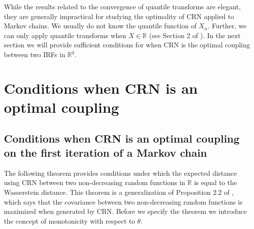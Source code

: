 \documentclass[12pt]{article}
\theoremstyle{plain}%
\theoremstyle{definition}
\begin{document}
While the results related to the convergence of quantile transforms are elegant, they are generally impractical for studying the optimality of CRN applied to Markov chains. We usually do not know the quantile function of $X_n$. Further, we can only apply quantile transforms when $X\in\mathbb{R}$ (see Section 2 of \cite{santambrogio}). In the next section we will provide sufficient conditions for when CRN is the optimal coupling between two IRFs in $\mathbb{R}^q$. %

\section{Conditions when CRN is an optimal coupling}

	\subsection{Conditions when CRN is an optimal coupling on the first iteration of a Markov chain}\label{sec:1step}

The following theorem provides conditions under which the expected distance using CRN between two non-decreasing random functions in $\mathbb{R}$ is equal to the Wasserstein distance. This theorem is a generalization of Proposition 2.2 of \cite{crn}, which says that the covariance between two non-decreasing random functions  is maximized when generated by CRN. Before we specify the theorem we introduce the concept of monotonicity with respect to $\theta$. 
\end{document}
